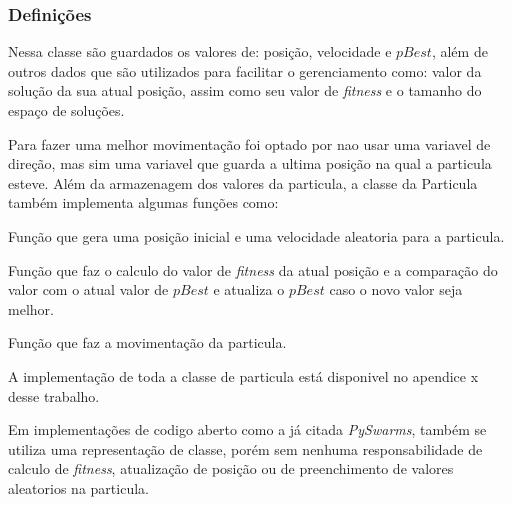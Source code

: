         \subsubsection{Definições}
            Nessa classe são guardados os valores de: posição, velocidade e $pBest$, além de outros dados que são utilizados para facilitar o gerenciamento como: valor da solução da sua atual posição, assim como seu valor de \textit{fitness} e o tamanho do espaço de soluções. \newline

            Para fazer uma melhor movimentação foi optado por nao usar uma variavel de direção, mas sim uma variavel que guarda a ultima posição na qual a particula esteve.\newline
            Além da armazenagem dos valores da particula, a classe da Particula também implementa algumas funções como:\newline
            
            Função \textbf{} que gera uma posição inicial e uma velocidade aleatoria para a particula.\newline
            
            Função \textbf{} que faz o calculo do valor de \textit{fitness} da atual posição e a comparação do valor com o atual valor de $pBest$ e atualiza o $pBest$ caso o novo valor seja melhor.\newline

            Função \textbf{} que faz a movimentação da particula.\newline
            

            \noindent A implementação de toda a classe de particula está disponivel no apendice x desse trabalho.\newline

            
            
            Em implementações de codigo aberto como a já citada \textit{PySwarms}, também se utiliza uma representação de classe, porém sem nenhuma responsabilidade de calculo de \textit{fitness}, atualização de posição ou de preenchimento de valores aleatorios na particula.\newline


